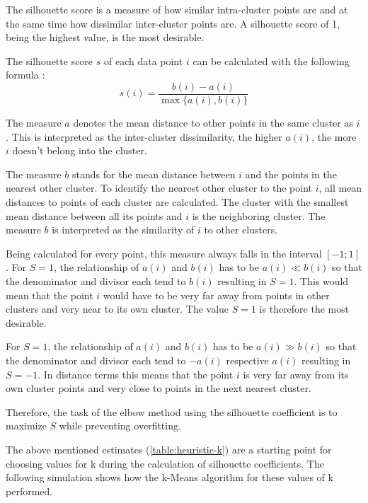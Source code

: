 The silhouette score is a measure of how similar intra-cluster points are and at the same time how dissimilar inter-cluster points are. A silhouette score of 1, being the highest value, is the most desirable.

The silhouette score $s$ of each data point $i$ can be calculated with the following formula \cite{kodinariyaReviewDeterminingCluster2013}:
\[ s(i) = \frac{b(i) - a(i)}{\max\{a(i),b(i)\}} \]

The measure $a$ denotes the mean distance to other points in the same cluster as $i$. This is interpreted as the inter-cluster dissimilarity, the higher $a(i)$, the more $i$ doesn't belong into the cluster.

The measure $b$ stands for the mean distance between $i$ and the points in the nearest other cluster. To identify the nearest other cluster to the point $i$, all mean distances to points of each cluster are calculated. The cluster with the smallest mean distance between all its points and $i$ is the neighboring cluster. The measure $b$ is interpreted as the similarity of $i$ to other clusters.

Being calculated for every point, this measure always falls in the interval $[-1;1]$. For $S = 1$, the relationship of $a(i)$ and $b(i)$ has to be $a(i) \ll b(i)$ so that the denominator and divisor each tend to $b(i)$ resulting in $S = 1$. This would mean that the point $i$ would have to be very far away from points in other clusters and very near to its own cluster. The value $S = 1$ is therefore the most desirable.

For $S = 1$, the relationship of $a(i)$ and $b(i)$ has to be $a(i) \gg b(i)$ so that the denominator and divisor each tend to $-a(i)$ respective $a(i)$ resulting in $S = -1$. In distance terms this means that the point $i$ is very far away from its own cluster points and very close to points in the next nearest cluster.

Therefore, the task of the elbow method using the silhouette coefficient is to maximize $S$ while preventing overfitting.

The above mentioned estimates (\ref{table:heuristic-k}) are a starting point for choosing values for k during the calculation of silhouette coefficients. The following simulation shows how the k-Means algorithm for these values of k performed.

